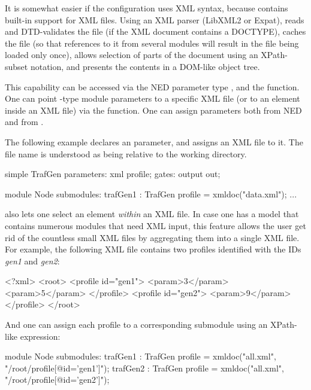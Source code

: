 It is somewhat easier if the configuration uses XML syntax, because {\opp}
contains built-in support for XML files. Using an XML parser (LibXML2 or
Expat), {\opp} reads and DTD-validates the file (if the XML document
contains a DOCTYPE), caches the file (so that references to it from several
modules will result in the file being loaded only once), allows selection
of parts of the document using an XPath-subset notation, and presents the
contents in a DOM-like object tree.

This capability can be accessed via the NED parameter type ,
and the  function. One can point -type
module parameters to a specific XML file (or to an element inside an XML
file) via the  function. One can assign 
parameters both from NED and from .

The following example declares an  parameter, and assigns an
XML file to it. The file name is understood as being relative to the working
directory.

\begin{ned}
simple TrafGen {
    parameters:
        xml profile;
    gates:
        output out;
}

module Node {
    submodules:
        trafGen1 : TrafGen {
            profile = xmldoc("data.xml");
        }
        ...
}
\end{ned}

 also lets one select an element \textit{within} an XML
file. In case one has a model that contains numerous modules that need XML
input, this feature allows the user get rid of the countless small XML
files by aggregating them into a single XML file. For example, the
following XML file contains two profiles identified with the IDs
\textit{gen1} and \textit{gen2}:

\begin{filelisting}
<?xml>
<root>
    <profile id="gen1">
          <param>3</param>
          <param>5</param>
    </profile>
    <profile id="gen2">
          <param>9</param>
    </profile>
</root>
\end{filelisting}

And one can assign each profile to a corresponding submodule using an XPath-like
expression:

\begin{ned}
module Node {
    submodules:
        trafGen1 : TrafGen {
            profile = xmldoc("all.xml", "/root/profile[@id='gen1']");
        }
        trafGen2 : TrafGen {
            profile = xmldoc("all.xml", "/root/profile[@id='gen2']");
        }
}
\end{ned}

